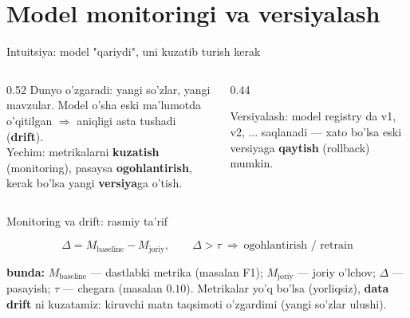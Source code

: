 \documentclass[aspectratio=169,11pt]{beamer}
\newcommand{\bunda}[1]{{\small\textbf{bunda:}\; #1}}
\begin{document}
\section[Monitoring]{Model monitoringi va versiyalash}

\begin{frame}{Intuitsiya: model "qariydi", uni kuzatib turish kerak}
  \begin{columns}[T]
    \begin{column}{0.52\textwidth}
      \small
      Dunyo o'zgaradi: yangi so'zlar, yangi mavzular. Model o'sha eski
      ma'lumotda o'qitilgan $\Rightarrow$ aniqligi asta tushadi (\textbf{drift}).\\[5pt]
      Yechim: metrikalarni \textbf{kuzatish} (monitoring), pasaysa
      \textbf{ogohlantirish}, kerak bo'lsa yangi \textbf{versiya}ga o'tish.
    \end{column}
    \begin{column}{0.44\textwidth}
      \begin{tcolorbox}[okbox,top=2pt,bottom=2pt]
        \footnotesize
        Versiyalash: model registry da v1, v2, ... saqlanadi --- xato bo'lsa
        eski versiyaga \textbf{qaytish} (rollback) mumkin.
      \end{tcolorbox}
    \end{column}
  \end{columns}
\end{frame}

\begin{frame}{Monitoring va drift: rasmiy ta'rif}
  \begin{tcolorbox}[defbox,title={Ta'rif: drift va ogohlantirish}]
    \vspace{-0.4em}
    $$ \Delta = M_{\text{baseline}} - M_{\text{joriy}}, \qquad
       \Delta > \tau \ \Rightarrow\ \text{ogohlantirish / retrain} $$
  \end{tcolorbox}
  \vspace{2pt}
  \bunda{$M_{\text{baseline}}$ --- dastlabki metrika (masalan F1); $M_{\text{joriy}}$
  --- joriy o'lchov; $\Delta$ --- pasayish; $\tau$ --- chegara (masalan $0.10$).}
  \vspace{4pt}
  \footnotesize Metrikalar yo'q bo'lsa (yorliqsiz), \textbf{data drift} ni
  kuzatamiz: kiruvchi matn taqsimoti o'zgardimi (yangi so'zlar ulushi).
\end{frame}
\end{document}
